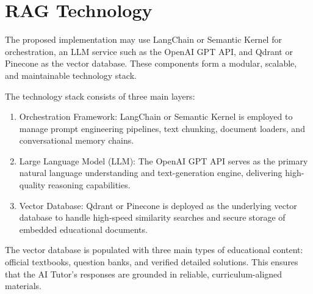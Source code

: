 \section{RAG Technology}

The proposed implementation may use LangChain or Semantic Kernel for orchestration, an LLM service such as the OpenAI GPT API, and Qdrant or Pinecone as the vector database. These components form a modular, scalable, and maintainable technology stack.

The technology stack consists of three main layers:

\begin{enumerate}
	\item Orchestration Framework: LangChain or Semantic Kernel is employed to manage prompt engineering pipelines, text chunking, document loaders, and conversational memory chains.
	\item Large Language Model (LLM): The OpenAI GPT API serves as the primary natural language understanding and text-generation engine, delivering high-quality reasoning capabilities.
	\item Vector Database: Qdrant or Pinecone is deployed as the underlying vector database to handle high-speed similarity searches and secure storage of embedded educational documents.
\end{enumerate}

The vector database is populated with three main types of educational content: official textbooks, question banks, and verified detailed solutions. This ensures that the AI Tutor's responses are grounded in reliable, curriculum-aligned materials.


